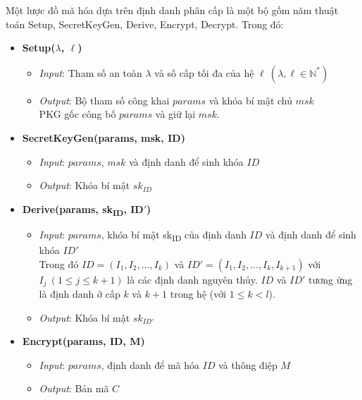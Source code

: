 \documentclass[class=report, crop=false]{standalone}
\begin{document}
		\begin{definition}[HIBE]
			Một lược đồ mã hóa dựa trên định danh phân cấp là một bộ gồm năm thuật toán \textsf{Setup, SecretKeyGen, Derive, Encrypt, Decrypt}. Trong đó:
			\vspace{-0.5cm}
			\begin{itemize}
				\item[] {\sffamily\bfseries Setup($\lambda$, $\ell$)}
				\begin{itemize}
					\item[\textbullet] \textit{Input}: Tham số an toàn $\lambda$ và số cấp tối đa của hệ $\ell \ (\lambda, \ell \in \mathbb{N^*})$
					\item[\textbullet] \textit{Output}: Bộ tham số công khai $params$ và khóa bí mật chủ $msk$ \\
					PKG gốc công bố $params$ và giữ lại $msk$.
				\end{itemize}
				\item[] {\sffamily\bfseries SecretKeyGen(params, msk, ID)}
				\begin{itemize}
					\item[\textbullet] \textit{Input}: $params$, $msk$ và định danh để sinh khóa $ID$
					\item[\textbullet] \textit{Output}: Khóa bí mật $sk_{ID}$
				\end{itemize}
				\item[] {\sffamily\bfseries Derive(params, sk\textsubscript{ID}, ID$'$)}
				\begin{itemize}
					\item[\textbullet] \textit{Input}: $params$, khóa bí mật sk\textsubscript{ID} của định danh $ID$ và định danh để sinh khóa $ID'$ \\
					Trong đó $ID = (I_1, I_2, ... ,I_k)$ và $ID' = (I_1, I_2, ... ,I_k, I_{k + 1})$ với $I_j \ (1 \leq j \leq k + 1)$ là các định danh nguyên thủy. $ID$ và $ID'$ tương ứng là định danh ở cấp $k$ và $k + 1$ trong hệ (với $1 \leq k < l$).
					\item[\textbullet] \textit{Output}: Khóa bí mật $sk_{ID'}$
				\end{itemize}
				\item[] {\sffamily\bfseries Encrypt(params, ID, M)}
				\begin{itemize}
					\item[\textbullet] \textit{Input}: $params$, định danh để mã hóa $ID$ và thông điệp $M$
					\item[\textbullet] \textit{Output}: Bản mã $C$
				\end{itemize}

\end{itemize}
\end{definition}
\end{document}
